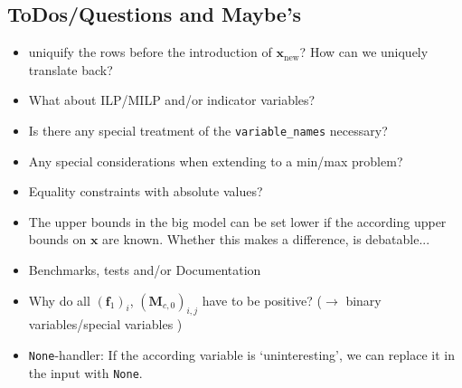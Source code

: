 \documentclass{article}
\newcommand{\vectorfont}[1]{\boldsymbol{#1}}%
\newcommand{\matrixfont}[1]{\mathbf{#1}}%
\newcommand{\bvec}{\vectorfont{b}}
\newcommand{\fvec}{\vectorfont{f}}
\newcommand{\nvec}{\vectorfont{n}}
\newcommand{\xvec}{\vectorfont{x}}
\newcommand{\Mmat}{\matrixfont{M}}
\renewcommand{\slash}{/\penalty\exhyphenpenalty\hspace{0pt}}
\begin{document}
\appendix

\subsection*{ToDos\slash Questions and Maybe's}

\begin{itemize}
	\item uniquify the rows before the introduction of $\xvec_{\mathrm{new}}$? How can we uniquely translate back?
	\item What about ILP\slash MILP and\slash or indicator variables?
	\item Is there any special treatment of the \texttt{variable\_names} necessary?
	\item Any special considerations when extending to a min\slash max problem?
	\item Equality constraints with absolute values?
	\item The upper bounds in the big model can be set lower if the according upper bounds on $\xvec$ are known. Whether this makes a difference, is debatable...
	\item Benchmarks, tests and\slash or Documentation
	\item Why do all $(\fvec_1)_i$, $(\Mmat_{c,0})_{i,j}$ have to be positive? ($\to$ binary variables\slash special variables ) 
	\item\texttt{None}-handler: If the according variable is \lq uninteresting\rq, we can replace it in the input with \texttt{None}.
\end{itemize}
\end{document}
